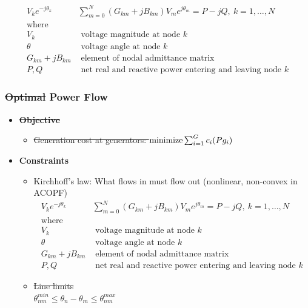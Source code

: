 \begin{frame}
      \begin{align*}
        V_k e^{-j\theta_k} & \sum^{N}_{m=0} (G_{km} + jB_{km})V_m e^{j\theta_m} = P - jQ,\ k = 1, \dots, N \\
        \text{where}\\
        V_k &\text{ voltage magnitude at node } k\\
        \theta &\text{ voltage angle at node } k\\
        G_{km} + jB_{km}& \text{ element of nodal admittance matrix}\\
        P, Q &\text{ net real and reactive power entering and leaving node } k
      \end{align*}
\end{frame}


\begin{frame}[fragile]
  \frametitle{\sout{Optimal} Power Flow}
  \begin{itemize}
    \item {\bf \sout{Objective}}
    \begin{itemize}
      \item \sout{Generation cost at generators:
      $ \minimize \sum^G_{i=1} c_i(Pg_i)$}
    \end{itemize}
    \item {\bf Constraints}
    \begin{itemize}
      \item Kirchhoff's law: What flows in must flow out (nonlinear, non-convex in ACOPF)
      \begin{align*}
        V_k e^{-j\theta_k} & \sum^{N}_{m=0} (G_{km} + jB_{km})V_m e^{j\theta_m} = P - jQ,\ k = 1, \dots, N \\
        \text{where}\\
        V_k &\text{ voltage magnitude at node } k\\
        \theta &\text{ voltage angle at node } k\\
        G_{km} + jB_{km}& \text{ element of nodal admittance matrix}\\
        P, Q &\text{ net real and reactive power entering and leaving node } k
      \end{align*}
      \item \sout{Line limits}\\
      \sout{$ \theta^{min}_{nm} \leq \theta_n - \theta_m \leq \theta^{max}_{nm}$}
    \end{itemize}
  \end{itemize}
\end{frame}

